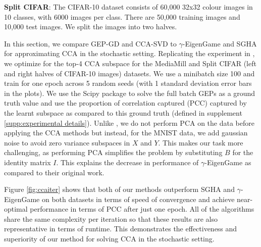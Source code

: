 \textbf{Split CIFAR}: The CIFAR-10 dataset \cite{krizhevsky2009learning} consists of 60,000 32x32 colour images in 10
classes, with 6000 images per class. There are 50,000 training images and 10,000 test images. We split the images into two halves.

In this section, we compare GEP-GD and CCA-SVD to $\gamma$-EigenGame \cite{gemp2022generalized} and SGHA \cite{chen2019constrained} for approximating CCA in the stochastic setting. Replicating the experiment in \cite{meng2021online, gemp2022generalized}, we optimize for the top-4 CCA subspace for the MediaMill and Split CIFAR (left and right halves of CIFAR-10 images) datasets. We use a minibatch size 100 and train for one epoch across 5 random seeds (with 1 standard deviation error bars in the plots). We use the Scipy \cite{virtanen2020scipy} package to solve the full batch GEPs as a ground truth value and use the proportion of correlation captured (PCC) captured by the learnt subspace as compared to this ground truth (defined in supplement \ref{supp:experimental details}). Unlike \cite{gemp2022generalized}, we do not perform PCA on the data before applying the CCA methods but instead, for the MNIST data, we add gaussian noise to avoid zero variance subspaces in $X$ and $Y$. This makes our task more challenging, as performing PCA simplifies the problem by substituting $B$ for the identity matrix $I$. This explains the decrease in performance of $\gamma$-EigenGame as compared to their original work.

Figure \ref{fig:ccaiter} shows that both of our methods outperform SGHA and $\gamma$-EigenGame on both datasets in terms of speed of convergence and achieve near-optimal performance in terms of PCC after just one epoch. All of the algorithms share the same complexity per iteration so that these results are also representative in terms of runtime. This demonstrates the effectiveness and superiority of our method for solving CCA in the stochastic setting.

